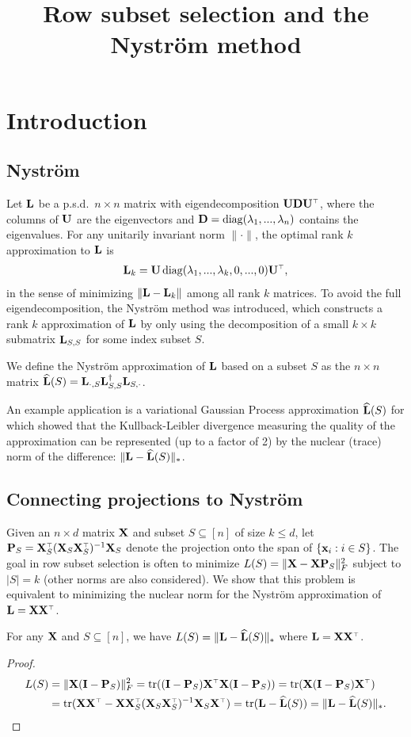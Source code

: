 \documentclass[12pt]{sty/colt2019/colt2018-arxiv}
\title{Row subset selection and the Nystr\"om method}
\begin{document}
\maketitle

\section{Introduction}

\subsection{Nystr\"om}
Let $\mathbf{L}$ be a p.s.d.~$n\times n$ matrix with eigendecomposition
$\U\D\U^\top$, where the columns of $\mathbf U$ are the eigenvectors and
$\mathbf D=\operatorname*{\mathop{\mathrm{diag}}}(\lambda_1,...,\lambda_n)$ contains the eigenvalues. For any
unitarily invariant norm $\|\cdot\|$, the optimal rank $k$
approximation to $\mathbf{L}$ is
\begin{align*}
  \L_k =\U\diag(\lambda_1,...,\lambda_k,0,...,0)\U^\top,
\end{align*}
in the sense of minimizing $\|\mathbf{L}-\mathbf{L}_k\|$ among all rank $k$
matrices. To avoid the full eigendecomposition, the Nystr\"om method
was introduced, which constructs a rank $k$ approximation of $\mathbf{L}$
by only using the decomposition of a small $k\times k$ submatrix
$\mathbf{L}_{S,S}$ for some index subset $S$. 
\begin{definition}
 We define the Nystr\"om approximation of $\mathbf{L}$ based on a subset $S$
 as the $n \times n$ matrix $\widehat{\mathbf{L}}(S)=\mathbf{L}_{\cdot,S}\mathbf{L}_{S,S}^\dagger\mathbf{L}_{S,\cdot}$.
\end{definition}
An example application is a variational Gaussian Process approximation
$\widehat{\mathbf{L}}(S)$ for which \cite{sparse-variational-gp} showed that the
Kullback-Leibler divergence measuring the quality of the 
approximation can be represented (up to a factor of 2) by the nuclear (trace)
norm of the difference: $\|\mathbf{L}-\widehat{\mathbf{L}}(S)\|_*$.

\subsection{Connecting projections to Nystr\"om}
Given an $n\times d$ matrix $\mathbf X$ and subset
$S\subseteq [n]$ of size $k\leq d$, let $\P_S =
\X_S^\top(\X_S\X_S^\top)^{-1}\X_S$ denote the projection onto
the span of $\{\mathbf x_i:i\in S\}$.
The goal in row subset selection is often to minimize $L(S) =
\|\mathbf X-\mathbf X\mathbf P_S\|_F^2$ subject to $|S|=k$ (other norms are also
considered). We show that this problem is 
equivalent to minimizing the nuclear norm for the Nystr\"om
approximation of $\L=\X\X^\top$.
\begin{lemma}
For any $\mathbf X$ and $S\subseteq [n]$, we have $L(S) = \|\mathbf{L} -
\widehat{\mathbf{L}}(S)\|_*$ where $\L=\X\X^\top$.
\end{lemma}
\begin{proof}
\begin{align*}
L(S)&=\|\X(\I-\P_S)\|_F^2 = \tr((\I - \P_S)\X^\top\X(\I-\P_S))=
  \tr(\X(\I-\P_S) \X^\top)\\
  & = \tr(\X\X^\top - \X\X_S^\top(\X_S\X_S^\top)^{-1}\X_S\X^\top) =
    \tr(\L-\widehat\L(S)) = \|\L-\widehat\L(S)\|_*.
\end{align*}  
\end{proof}
\end{document}

